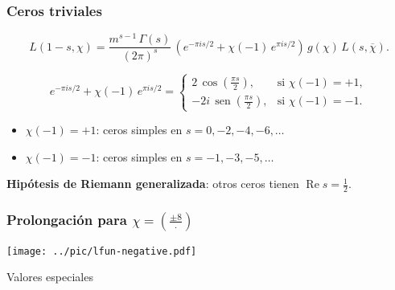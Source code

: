 \documentclass{beamer}
\renewcommand{\Re}{\operatorname{Re}}
\renewcommand{\sin}{\operatorname{sen}}
\begin{document}
\begin{frame}
  \frametitle{Ceros triviales}

  \[ L (1-s,\chi) = \frac{m^{s-1}\,\Gamma (s)}{(2\pi)^s} \, \left(e^{-\pi i s/2} + \chi (-1)\,e^{\pi i s/2}\right)\,g (\chi) \, L (s,\overline{\chi}). \]

  \[ e^{-\pi i s/2} + \chi (-1)\,e^{\pi i s/2} = \begin{cases}
  2 \, \cos \left(\frac{\pi s}{2}\right), & \text{si }\chi (-1) = +1,\\
  -2i \, \sin \left(\frac{\pi s}{2}\right), & \text{si }\chi (-1) = -1.
  \end{cases} \]

  \begin{itemize}
  \item $\chi (-1) = +1$: ceros simples en $s = 0, -2, -4, -6, \ldots$

  \item $\chi (-1) = -1$: ceros simples en $s = -1, -3, -5, \ldots$
  \end{itemize}

  \textbf{Hipótesis de Riemann generalizada}: otros ceros tienen
  $\Re s = \frac{1}{2}$.
\end{frame}


\begin{frame}
  \frametitle{Prolongación para $\chi = \left(\frac{\pm 8}{\cdot}\right)$}

  \begin{center}  
    \texttt{[image: ../pic/lfun-negative.pdf]}
  \end{center}
\end{frame}


\begin{frame}[plain]
  \headingfont

  \begin{center}
    {\huge Valores especiales}
  \end{center}
\end{frame}

\end{document}
